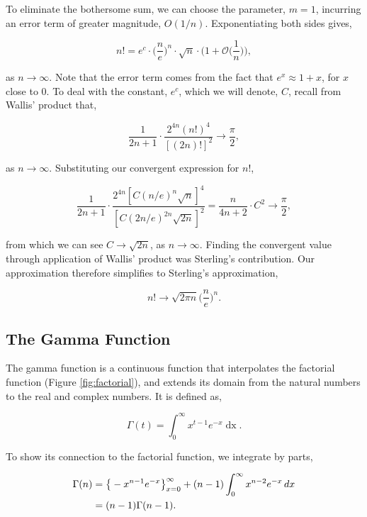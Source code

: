 \documentclass[11pt]{amsart}
\begin{document}
To eliminate the bothersome sum, we can choose the parameter, $m = 1$, incurring an error term of greater magnitude, $O(1/n)$. Exponentiating both sides gives,

$$n! = e^c\cdot\Bigg(\frac{n}{e}\Bigg)^n \cdot \sqrt{n} \cdot \Bigg(1 + \mathcal{O}\Bigg(\frac{1}{n}\Bigg)\Bigg),$$

as $n \to \infty$. Note that the error term comes from the fact that $e^x \approx 1 + x$, for $x$ close to 0. To deal with the constant, $e^c$, which we will denote, $C$, recall from Wallis' product that,

$$\frac{1}{2n + 1} \cdot \frac{2^{4n}(n!)^4}{[(2n)!]^2} \to \frac{\pi}{2},$$

as $n \to \infty$. Substituting our convergent expression for $n!$,

$$\frac{1}{2n + 1} \cdot \frac{2^{4n}[C(n/e)^n\sqrt{n}]^4}{[C(2n/e)^{2n}\sqrt{2n}]^2} = \frac{n}{4n + 2}\cdot C^2 \to \frac{\pi}{2},$$

from which we can see $C \to \sqrt{2n}$, as $n \to \infty$. Finding the convergent value through application of Wallis' product was Sterling's contribution. Our approximation therefore simplifies to Sterling's approximation,

$$n! \to \sqrt{2\pi n}\Bigg(\frac{n}{e}\Bigg)^n.$$

\subsection{The Gamma Function}

The gamma function is a continuous function that interpolates the factorial function (Figure \ref{fig:factorial}), and extends its domain from the natural numbers to the real and complex numbers. It is defined as,

$$\Gamma(t) = \int_0^{\infty} x^{t-1}e^{-x}\mathop{dx}.$$

To show its connection to the factorial function, we integrate by parts,

\begin{align}
\Gamma(n) &= \big\{-x^{n-1}e^{-x}\big\}_{x=0}^{\infty} + (n - 1)\int_0^{\infty} x^{n-2}e^{-x}\mathop{dx} \notag \\
&= (n-1)\Gamma(n-1).\notag
\end{align}
\end{document}

